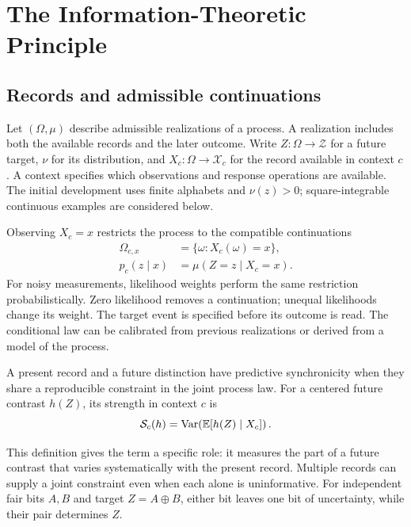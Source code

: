 \section{The Information-Theoretic Principle}
\label{sec:information}
\subsection{Records and admissible continuations}
Let \((\Omega,\mu)\) describe admissible realizations of a process. A realization includes both the available records and the later outcome. Write \(Z:\Omega\to\mathcal Z\) for a future target, \(\nu\) for its distribution, and \(X_c:\Omega\to\mathcal X_c\) for the record available in context \(c\). A context specifies which observations and response operations are available. The initial development uses finite alphabets and \(\nu(z)>0\); square-integrable continuous examples are considered below.

Observing \(X_c=x\) restricts the process to the compatible continuations
\begin{equation}
\begin{aligned}
\Omega_{c,x}&=\{\omega:X_c(\omega)=x\},\\
p_c(z\mid x)&=\mu(Z=z\mid X_c=x).
\end{aligned}
\label{eq:posterior}
\end{equation}
For noisy measurements, likelihood weights perform the same restriction probabilistically. Zero likelihood removes a continuation; unequal likelihoods change its weight. The target event is specified before its outcome is read. The conditional law can be calibrated from previous realizations or derived from a model of the process.

\begin{definition}
A present record and a future distinction have predictive synchronicity when they share a reproducible constraint in the joint process law. For a centered future contrast \(h(Z)\), its strength in context \(c\) is
\begin{equation}
\mathcal S_c(h)=\operatorname{Var}\!\left(\mathbb E[h(Z)\mid X_c]\right).
\label{eq:synchronicity}
\end{equation}
\end{definition}
This definition gives the term a specific role: it measures the part of a future contrast that varies systematically with the present record. Multiple records can supply a joint constraint even when each alone is uninformative. For independent fair bits \(A,B\) and target \(Z=A\oplus B\), either bit leaves one bit of uncertainty, while their pair determines \(Z\).


